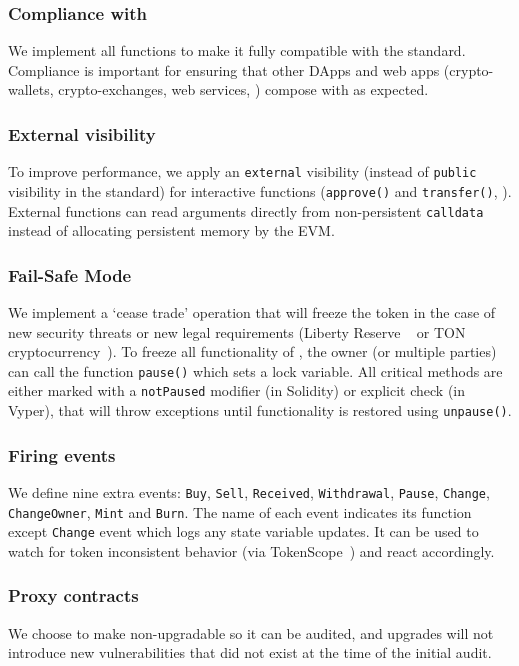 \subsubsection{Compliance with \erc}
We implement all \erc functions to make it fully compatible with the standard. Compliance is important for ensuring that other DApps and web apps (\ie crypto-wallets, crypto-exchanges, web services, \etc) compose with \sys as expected. 

\subsubsection{External visibility}
To improve performance, we apply an \texttt{external} visibility (instead of \texttt{public} visibility in the standard) for interactive functions (\eg \texttt{approve()} and \texttt{transfer()}, \etc).  External functions can read arguments directly from non-persistent \texttt{calldata} instead of allocating persistent memory by the EVM. 

\subsubsection{Fail-Safe Mode}
We implement a `cease trade' operation that will freeze the token in the case of new security threats or new legal requirements (\eg Liberty Reserve ~\cite{LibertyReserve} or TON cryptocurrency~\cite{TON}). To freeze all functionality of \sys, the owner (or multiple parties) can call the function \texttt{pause()} which sets a lock variable. All critical methods are either marked with a \texttt{notPaused} modifier (in Solidity) or explicit check (in Vyper), that will throw exceptions until functionality is restored using \texttt{unpause()}. 

\subsubsection{Firing events}
We define nine extra events: \texttt{Buy}, \texttt{Sell}, \texttt{Received}, \texttt{Withdrawal}, \texttt{Pause}, \texttt{Change}, \texttt{ChangeOwner}, \texttt{Mint} and \texttt{Burn}. The name of each event indicates its function except \texttt{Change} event which logs any state variable updates. It can be used to watch for token inconsistent behavior (\eg via TokenScope~\cite{TokenScope}) and react accordingly. 
	
\subsubsection{Proxy contracts}
We choose to make \sys non-upgradable so it can be audited, and upgrades will not introduce new vulnerabilities that did not exist at the time of the initial audit. 
	
